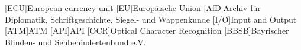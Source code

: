 \begin{acronym}[ECU]
[ECU]{European currency unit}
[EU]{Europäische Union}
[AfD]{Archiv für Diplomatik, Schriftgeschichte, Siegel- und Wappenkunde}
[I/O]{Input and Output}
[ATM]{ATM}
[API]{API}
[OCR]{Optical Character Recognition}
[BBSB]{Bayrischer Blinden- und Sehbehindertenbund e.V.}
\end{acronym}

